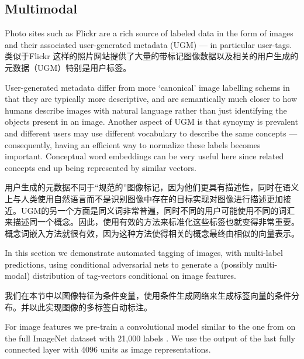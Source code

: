 \documentclass{article} %
\begin{document}
\subsection{Multimodal}
Photo sites such as Flickr are a rich source of labeled data in the form of images and
their associated user-generated metadata (UGM) --- in particular user-tags.
类似于Flickr 这样的照片网站提供了大量的带标记图像数据以及相关的用户生成的元数据（UGM）特别是用户标签。

User-generated metadata differ from more `canonical' image labelling schems in that they are typically
more descriptive, and are semantically much closer to how humans describe images with natural language
rather than just identifying the objects present in an image. Another aspect of UGM is that synoymy is
prevalent and different users may use different vocabulary to describe the same concepts --- consequently,
having an efficient way to normalize these labels becomes important. Conceptual word embeddings \cite{mikolov-et-al-iclr2013}
can be very useful here since related concepts end up being represented by similar vectors.

用户生成的元数据不同于“规范的”图像标记，因为他们更具有描述性，同时在语义上与人类使用自然语言而不是识别图像中存在的目标实现对图像进行描述更加接近。UGM的另一个方面是同义词非常普遍，同时不同的用户可能使用不同的词汇来描述同一个概念。因此，使用有效的方法来标准化这些标签也就变得非常重要。概念词嵌入方法\cite{mikolov-et-al-iclr2013}就很有效，因为这种方法使得相关的概念最终由相似的向量表示。

In this section we demonstrate automated tagging of images, with multi-label predictions,
using conditional adversarial nets to generate a (possibly multi-modal) distribution
of tag-vectors conditional on image features.

我们在本节中以图像特征为条件变量，使用条件生成网络来生成标签向量的条件分布。并以此实现图像的多标签自动标注。


For image features we pre-train a convolutional model similar to the one from \cite{Krizhevsky-2012}
on the full ImageNet dataset with 21,000 labels \cite{RussakovskyFeiFei}.
We use the output of the last fully connected layer with 4096 units as image representations.
\end{document}
